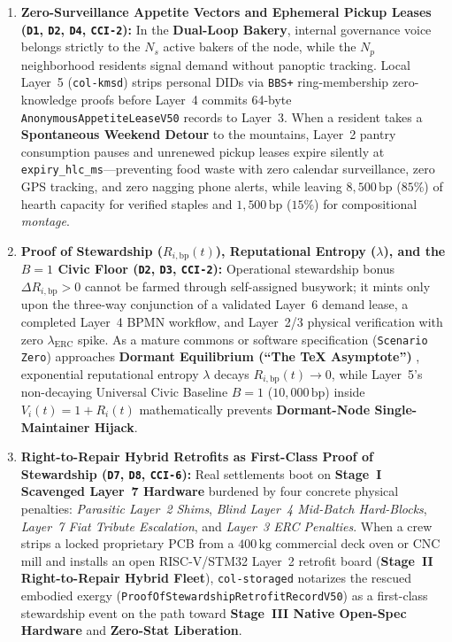 \begin{enumerate}
    \item \textbf{Zero-Surveillance Appetite Vectors and Ephemeral Pickup Leases (\texttt{D1}, \texttt{D2}, \texttt{D4}, \texttt{CCI-2}):} In the \textbf{Dual-Loop Bakery}, internal governance voice belongs strictly to the $N_s$ active bakers of the node, while the $N_p$ neighborhood residents signal demand without panoptic tracking. Local Layer~5 (\texttt{col-kmsd}) strips personal DIDs via \texttt{BBS+} ring-membership zero-knowledge proofs before Layer~4 commits 64-byte \texttt{AnonymousAppetiteLeaseV50} records to Layer~3. When a resident takes a \textbf{Spontaneous Weekend Detour} to the mountains, Layer~2 pantry consumption pauses and unrenewed pickup leases expire silently at \texttt{expiry\_hlc\_ms}---preventing food waste with zero calendar surveillance, zero GPS tracking, and zero nagging phone alerts, while leaving $8{,}500\,\mathrm{bp}$ ($85\%$) of hearth capacity for verified staples and $1{,}500\,\mathrm{bp}$ ($15\%$) for compositional \textit{montage}.
    \item \textbf{Proof of Stewardship ($R_{i,\mathrm{bp}}(t)$), Reputational Entropy ($\lambda$), and the $B=1$ Civic Floor (\texttt{D2}, \texttt{D3}, \texttt{CCI-2}):} Operational stewardship bonus $\Delta R_{i,\mathrm{bp}} > 0$ cannot be farmed through self-assigned busywork; it mints only upon the three-way conjunction of a validated Layer~6 demand lease, a completed Layer~4 BPMN workflow, and Layer~2/3 physical verification with zero $\lambda_{\mathrm{ERC}}$ spike. As a mature commons or software specification (\texttt{Scenario Zero}) approaches \textbf{Dormant Equilibrium (``The TeX Asymptote'')} \parencite{knuth1984tex}, exponential reputational entropy $\lambda$ decays $R_{i,\mathrm{bp}}(t) \to 0$, while Layer~5's non-decaying Universal Civic Baseline $B = 1$ ($10{,}000\,\mathrm{bp}$) inside $V_i(t) = 1 + R_i(t)$ mathematically prevents \textbf{Dormant-Node Single-Maintainer Hijack}.
    \item \textbf{Right-to-Repair Hybrid Retrofits as First-Class Proof of Stewardship (\texttt{D7}, \texttt{D8}, \texttt{CCI-6}):} Real settlements boot on \textbf{Stage~I Scavenged Layer~7 Hardware} burdened by four concrete physical penalties: \textit{Parasitic Layer~2 Shims}, \textit{Blind Layer~4 Mid-Batch Hard-Blocks}, \textit{Layer~7 Fiat Tribute Escalation}, and \textit{Layer~3 ERC Penalties}. When a crew strips a locked proprietary PCB from a $400\,\mathrm{kg}$ commercial deck oven or CNC mill and installs an open RISC-V/STM32 Layer~2 retrofit board (\textbf{Stage~II Right-to-Repair Hybrid Fleet}), \texttt{col-storaged} notarizes the rescued embodied exergy (\texttt{ProofOfStewardshipRetrofitRecordV50}) as a first-class stewardship event on the path toward \textbf{Stage~III Native Open-Spec Hardware} and \textbf{Zero-Stat Liberation}.

\end{enumerate}
